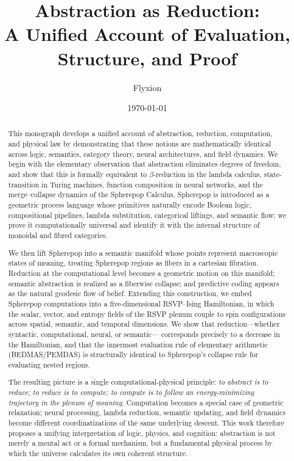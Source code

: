 \documentclass[11pt,letterpaper]{article}
\title{\textbf{Abstraction as Reduction:}\\
A Unified Account of Evaluation, Structure, and Proof}
\author{Flyxion}
\date{\today}
\begin{document}
\maketitle
\thispagestyle{empty}

\begin{abstract}
This monograph develops a unified account of abstraction, reduction, computation, 
and physical law by demonstrating that these notions are mathematically identical 
across logic, semantics, category theory, neural architectures, and field dynamics.  
We begin with the elementary observation that abstraction eliminates degrees of 
freedom, and show that this is formally equivalent to $\beta$-reduction in the 
lambda calculus, state-transition in Turing machines, function composition in 
neural networks, and the merge--collapse dynamics of the Spherepop Calculus.  
Spherepop is introduced as a geometric process language whose primitives naturally 
encode Boolean logic, compositional pipelines, lambda substitution, categorical 
liftings, and semantic flow; we prove it computationally universal and identify it 
with the internal structure of monoidal and fibred categories.  

We then lift Spherepop into a semantic manifold whose points represent macroscopic 
states of meaning, treating Spherepop regions as fibers in a cartesian fibration.  
Reduction at the computational level becomes a geometric motion on this manifold; 
semantic abstraction is realized as a fiberwise collapse; and predictive coding 
appears as the natural geodesic flow of belief.  Extending this construction, we 
embed Spherepop computations into a five-dimensional RSVP--Ising Hamiltonian, in 
which the scalar, vector, and entropy fields of the RSVP plenum couple to 
spin configurations across spatial, semantic, and temporal dimensions.  
We show that reduction---whether syntactic, computational, neural, or semantic---
corresponds precisely to a decrease in the Hamiltonian, and that the innermost 
evaluation rule of elementary arithmetic (BEDMAS/PEMDAS) is structurally identical 
to Spherepop's collapse rule for evaluating nested regions.  

The resulting picture is a single computational-physical principle:  
\emph{to abstract is to reduce; to reduce is to compute; to compute is to follow an 
energy-minimizing trajectory in the plenum of meaning}.  
Computation becomes a special case of geometric relaxation; neural processing, 
lambda reduction, semantic updating, and field dynamics become different 
coordinatizations of the same underlying descent.  
This work therefore proposes a unifying interpretation of logic, physics, and 
cognition: abstraction is not merely a mental act or a formal mechanism, but a 
fundamental physical process by which the universe calculates its own coherent 
structure.
\end{abstract}
\end{document}
